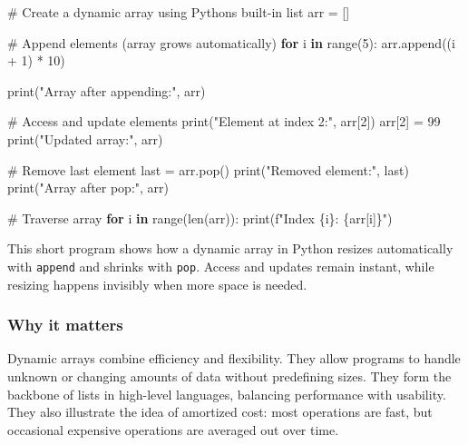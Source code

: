 \documentclass[
  letterpaper,
  DIV=11,
  numbers=noendperiod]{scrreprt}
\newenvironment{Shaded}{\begin{snugshade}}{\end{snugshade}}
\newcommand{\BuiltInTok}[1]{\textcolor[rgb]{0.00,0.23,0.31}{#1}}
\newcommand{\CommentTok}[1]{\textcolor[rgb]{0.37,0.37,0.37}{#1}}
\newcommand{\ControlFlowTok}[1]{\textcolor[rgb]{0.00,0.23,0.31}{\textbf{#1}}}
\newcommand{\DecValTok}[1]{\textcolor[rgb]{0.68,0.00,0.00}{#1}}
\newcommand{\KeywordTok}[1]{\textcolor[rgb]{0.00,0.23,0.31}{\textbf{#1}}}
\newcommand{\NormalTok}[1]{\textcolor[rgb]{0.00,0.23,0.31}{#1}}
\newcommand{\OperatorTok}[1]{\textcolor[rgb]{0.37,0.37,0.37}{#1}}
\newcommand{\SpecialCharTok}[1]{\textcolor[rgb]{0.37,0.37,0.37}{#1}}
\newcommand{\SpecialStringTok}[1]{\textcolor[rgb]{0.13,0.47,0.30}{#1}}
\newcommand{\StringTok}[1]{\textcolor[rgb]{0.13,0.47,0.30}{#1}}
\begin{document}
\begin{Shaded}
\begin{Highlighting}[]
\CommentTok{\# Create a dynamic array using Python\textquotesingle{}s built{-}in list}
\NormalTok{arr }\OperatorTok{=}\NormalTok{ []}

\CommentTok{\# Append elements (array grows automatically)}
\ControlFlowTok{for}\NormalTok{ i }\KeywordTok{in} \BuiltInTok{range}\NormalTok{(}\DecValTok{5}\NormalTok{):}
\NormalTok{    arr.append((i }\OperatorTok{+} \DecValTok{1}\NormalTok{) }\OperatorTok{*} \DecValTok{10}\NormalTok{)}

\BuiltInTok{print}\NormalTok{(}\StringTok{"Array after appending:"}\NormalTok{, arr)}

\CommentTok{\# Access and update elements}
\BuiltInTok{print}\NormalTok{(}\StringTok{"Element at index 2:"}\NormalTok{, arr[}\DecValTok{2}\NormalTok{])}
\NormalTok{arr[}\DecValTok{2}\NormalTok{] }\OperatorTok{=} \DecValTok{99}
\BuiltInTok{print}\NormalTok{(}\StringTok{"Updated array:"}\NormalTok{, arr)}

\CommentTok{\# Remove last element}
\NormalTok{last }\OperatorTok{=}\NormalTok{ arr.pop()}
\BuiltInTok{print}\NormalTok{(}\StringTok{"Removed element:"}\NormalTok{, last)}
\BuiltInTok{print}\NormalTok{(}\StringTok{"Array after pop:"}\NormalTok{, arr)}

\CommentTok{\# Traverse array}
\ControlFlowTok{for}\NormalTok{ i }\KeywordTok{in} \BuiltInTok{range}\NormalTok{(}\BuiltInTok{len}\NormalTok{(arr)):}
    \BuiltInTok{print}\NormalTok{(}\SpecialStringTok{f"Index }\SpecialCharTok{\{}\NormalTok{i}\SpecialCharTok{\}}\SpecialStringTok{: }\SpecialCharTok{\{}\NormalTok{arr[i]}\SpecialCharTok{\}}\SpecialStringTok{"}\NormalTok{)}
\end{Highlighting}
\end{Shaded}

This short program shows how a dynamic array in Python resizes
automatically with \texttt{append} and shrinks with \texttt{pop}. Access
and updates remain instant, while resizing happens invisibly when more
space is needed.

\subsubsection{Why it matters}\label{why-it-matters-15}

Dynamic arrays combine efficiency and flexibility. They allow programs
to handle unknown or changing amounts of data without predefining sizes.
They form the backbone of lists in high-level languages, balancing
performance with usability. They also illustrate the idea of amortized
cost: most operations are fast, but occasional expensive operations are
averaged out over time.
\end{document}
